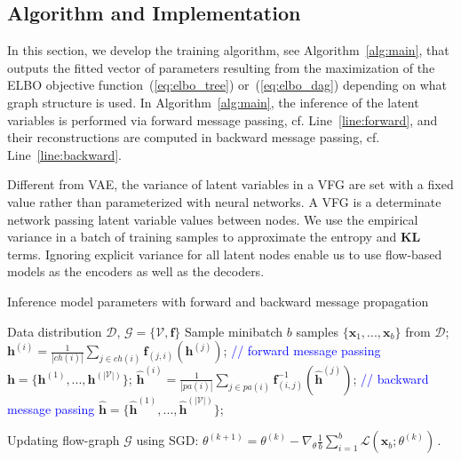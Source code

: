 \documentclass{article} %
\newcommand{\belhal}[1]{{\color{red}{\bf\sf [BK: #1]}}}
\begin{document}
\subsection{Algorithm and Implementation}
In this section, we develop the training algorithm, see Algorithm~\ref{alg:main}, that outputs the fitted vector of parameters resulting from the maximization of the ELBO objective function~(\eqref{eq:elbo_tree}) or~(\eqref{eq:elbo_dag}) depending on what graph structure is used.
In Algorithm~\ref{alg:main}, the inference of the latent variables is performed via forward message passing, cf. Line~\ref{line:forward}, and their reconstructions are computed in backward message passing, cf. Line~\ref{line:backward}.

\belhal{To Improve. We should add a paragraph on implementation and ELBO/gradient computation} 
Different from VAE,  the variance of latent variables in a VFG are set with a fixed value rather than parameterized with neural networks. A VFG is a determinate network passing latent variable values between nodes. 
We use the empirical variance in a batch of training samples to approximate the entropy and \textbf{KL} terms. 
\belhal{KL  term between Gaussian priors is tractable, why do we approximate it?}
Ignoring  explicit variance  for all latent nodes enable us to use flow-based models as the encoders as well as the decoders. 





\begin{algorithm}[H]
   \caption{Inference model parameters with  forward and backward message propagation}
   \label{alg:main}
\begin{algorithmic}[1]
    Data distribution $\mathcal{D}$,  $\mathcal{G} = \{\mathcal{V}, \mathbf{f}\}$
   \STATE  Sample minibatch $b$ samples $\{\mathbf{x}_1, ..., \mathbf{x}_b \}$ from $\mathcal{D}$;
   \STATE $\mathbf{h}^{(i)} = \frac{1}{|ch(i)|} \sum_{j \in ch(i) } \mathbf{f}_{(j,i)}(\mathbf{h}^{(j)})$; \label{line:forward} \textcolor{blue}{// forward message passing}
   \ENDFOR
    \STATE  $\mathbf{h} =  \{\mathbf{h}^{(1)}, ...,  \mathbf{h}^{(|\mathcal{V}|)}  \}$;
   \STATE $\widehat{\mathbf{h}}^{(i)} = \frac{1}{|pa(i)|} \sum_{j \in pa(i) } \mathbf{f}^{-1}_{ (i,j)}(\widehat{\mathbf{h}}^{(j)}) $;\label{line:backward}  \textcolor{blue}{// backward message passing}
   \ENDFOR
    \STATE  $ \widehat{\mathbf{h}} =  \{\widehat{\mathbf{h}}^{(1)}, ...,  \widehat{\mathbf{h}}^{(|\mathcal{V}|)}  \}$;
    
    \STATE Updating flow-graph $\mathcal{G}$ using SGD: $\theta^{(k+1)} = \theta^{(k)} -  \nabla_{\theta}\frac{1}{b} \sum_{i=1}^b  \mathcal{L}(\mathbf{x}_b; \theta^{(k)})   \, .$
   \ENDFOR
\end{algorithmic}
\end{algorithm}
\end{document}
